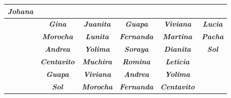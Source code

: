 \begin{table}[H]
{\begin{tabular}{|c|ccccc|}
  \textit{\textbf{Johana}} \\ \hline
\rowcolor[HTML]{A1DA8E} 
\cellcolor[HTML]{32CB00} &
  \multicolumn{1}{c|}{\cellcolor[HTML]{A1DA8E}\textit{\textbf{Gina}}} &
  \multicolumn{1}{c|}{\cellcolor[HTML]{A1DA8E}\textit{\textbf{Juanita}}} &
  \multicolumn{1}{c|}{\cellcolor[HTML]{A1DA8E}\textit{\textbf{Guapa}}} &
  \multicolumn{1}{c|}{\cellcolor[HTML]{A1DA8E}\textit{\textbf{Viviana}}} &
  \textit{\textbf{Lucia}} \\ \cline{2-6} 
\rowcolor[HTML]{A1DA8E} 
\cellcolor[HTML]{32CB00} &
  \multicolumn{1}{c|}{\cellcolor[HTML]{A1DA8E}\textit{\textbf{Morocha}}} &
  \multicolumn{1}{c|}{\cellcolor[HTML]{A1DA8E}\textit{\textbf{Lunita}}} &
  \multicolumn{1}{c|}{\cellcolor[HTML]{A1DA8E}\textit{\textbf{Fernanda}}} &
  \multicolumn{1}{c|}{\cellcolor[HTML]{A1DA8E}\textit{\textbf{Martina}}} &
  \textit{\textbf{Pacha}} \\ \cline{2-6} 
\rowcolor[HTML]{A1DA8E} 
\cellcolor[HTML]{32CB00} &
  \multicolumn{1}{c|}{\cellcolor[HTML]{A1DA8E}\textit{\textbf{Andrea}}} &
  \multicolumn{1}{c|}{\cellcolor[HTML]{A1DA8E}\textit{\textbf{Yolima}}} &
  \multicolumn{1}{c|}{\cellcolor[HTML]{A1DA8E}\textit{\textbf{Soraya}}} &
  \multicolumn{1}{c|}{\cellcolor[HTML]{A1DA8E}\textit{\textbf{Dianita}}} &
  \textit{\textbf{Sol}} \\ \cline{2-6} 
\rowcolor[HTML]{A1DA8E} 
\multirow{-4}{*}{\cellcolor[HTML]{32CB00}\textit{\textbf{3}}} &
  \multicolumn{1}{c|}{\cellcolor[HTML]{A1DA8E}\textit{\textbf{Centavito}}} &
  \multicolumn{1}{c|}{\cellcolor[HTML]{A1DA8E}\textit{\textbf{Muchira}}} &
  \multicolumn{1}{c|}{\cellcolor[HTML]{A1DA8E}\textit{\textbf{Romina}}} &
  \multicolumn{1}{c|}{\cellcolor[HTML]{A1DA8E}\textit{\textbf{Leticia}}} &
  \textit{\textbf{}} \\ \hline
\rowcolor[HTML]{FFFFC7} 
\cellcolor[HTML]{FFFE65} &
  \multicolumn{1}{c|}{\cellcolor[HTML]{FFFFC7}\textit{\textbf{Guapa}}} &
  \multicolumn{1}{c|}{\cellcolor[HTML]{FFFFC7}\textit{\textbf{Viviana}}} &
  \multicolumn{1}{c|}{\cellcolor[HTML]{FFFFC7}\textit{\textbf{Andrea}}} &
  \multicolumn{1}{c|}{\cellcolor[HTML]{FFFFC7}\textit{\textbf{Yolima}}} &
  \textit{\textbf{}} \\ \cline{2-6} 
\rowcolor[HTML]{FFFFC7} 
\cellcolor[HTML]{FFFE65} &
  \multicolumn{1}{c|}{\cellcolor[HTML]{FFFFC7}\textit{\textbf{Sol}}} &
  \multicolumn{1}{c|}{\cellcolor[HTML]{FFFFC7}\textit{\textbf{Morocha}}} &
  \multicolumn{1}{c|}{\cellcolor[HTML]{FFFFC7}\textit{\textbf{Fernanda}}} &
  \multicolumn{1}{c|}{\cellcolor[HTML]{FFFFC7}\textit{\textbf{Centavito}}} &

\end{tabular}}
\end{table}
